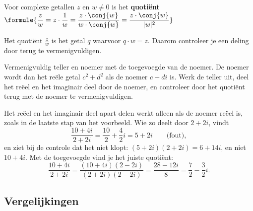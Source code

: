 \begin{theorie}
Voor complexe getallen $z$ en $w \neq 0$ is het \textbf{\textcolor{accent}{quotiënt}} \quad $\formule{\dfrac{z}{w} = z \cdot \dfrac{1}{w} = \dfrac{z \cdot \conj{w}}{w \cdot \conj{w}} = \dfrac{z \cdot \conj{w}}{|w|^2}}$
\end{theorie}

Het quotiënt $\frac{z}{w}$ is het getal $q$ waarvoor $q \cdot w = z$. Daarom controleer je een deling door terug te vermenigvuldigen.


\begin{werkwijze}
Vermenigvuldig teller en noemer met de toegevoegde van de noemer. De noemer wordt dan het reële getal $c^2 + d^2$ als de noemer $c + di$ is. Werk de teller uit, deel het reëel en het imaginair deel door de noemer, en controleer door het quotiënt terug met de noemer te vermenigvuldigen.
\end{werkwijze}

Het reëel en het imaginair deel apart delen werkt alleen als de noemer reëel is, zoals in de laatste stap van het voorbeeld. Wie zo deelt door $2 + 2i$, vindt
\[ \frac{10 + 4i}{2 + 2i} = \frac{10}{2} + \frac{4}{2}i = 5 + 2i \qquad \text{(fout)} , \]
en ziet bij de controle dat het niet klopt: $(5 + 2i)(2 + 2i) = 6 + 14i$, en niet $10 + 4i$. Met de toegevoegde vind je het juiste quotiënt:
\[ \frac{10 + 4i}{2 + 2i} = \frac{(10 + 4i)(2 - 2i)}{(2 + 2i)(2 - 2i)} = \frac{28 - 12i}{8} = \frac72 - \frac32 i . \]

\begin{oefeningen}
\end{oefeningen}

\subsection{Vergelijkingen}

